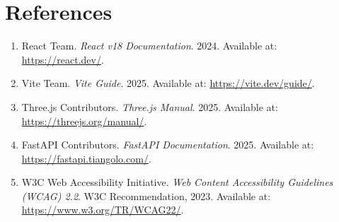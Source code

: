 \documentclass[11pt]{article}
\begin{document}
\section*{References}
\begin{enumerate}[leftmargin=2.2em]
    \item React Team. \emph{React v18 Documentation}. 2024. Available at: \url{https://react.dev/}.
    \item Vite Team. \emph{Vite Guide}. 2025. Available at: \url{https://vite.dev/guide/}.
    \item Three.js Contributors. \emph{Three.js Manual}. 2025. Available at: \url{https://threejs.org/manual/}.
    \item FastAPI Contributors. \emph{FastAPI Documentation}. 2025. Available at: \url{https://fastapi.tiangolo.com/}.
    \item W3C Web Accessibility Initiative. \emph{Web Content Accessibility Guidelines (WCAG) 2.2}. W3C Recommendation, 2023. Available at: \url{https://www.w3.org/TR/WCAG22/}.
\end{enumerate}
\end{document}

